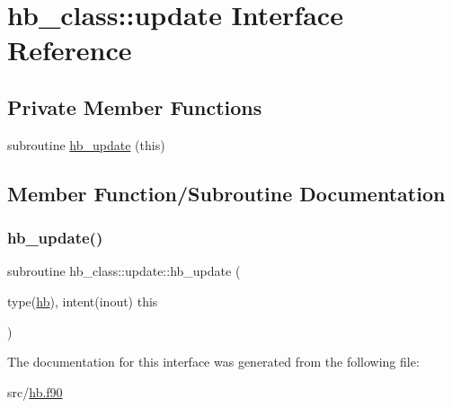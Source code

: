 \hypertarget{interfacehb__class_1_1update}{}\section{hb\+\_\+class\+:\+:update Interface Reference}
\label{interfacehb__class_1_1update}
\subsection*{Private Member Functions}
\begin{DoxyCompactItemize}
\item 
subroutine \hyperlink{interfacehb__class_1_1update_aaeface7e147ec5602333218403fcbbdf}{hb\+\_\+update} (this)
\end{DoxyCompactItemize}


\subsection{Member Function/\+Subroutine Documentation}
\mbox{\label{interfacehb__class_1_1update_aaeface7e147ec5602333218403fcbbdf}} 
\subsubsection{\texorpdfstring{hb\+\_\+update()}{hb\_update()}}
{\footnotesize\ttfamily subroutine hb\+\_\+class\+::update\+::hb\+\_\+update (\begin{DoxyParamCaption}\item[{type(\hyperlink{structhb__class_1_1hb}{hb}), intent(inout)}]{this }\end{DoxyParamCaption})\hspace{0.3cm}{\ttfamily [private]}}



The documentation for this interface was generated from the following file\+:\begin{DoxyCompactItemize}
\item 
src/\hyperlink{hb_8f90}{hb.\+f90}\end{DoxyCompactItemize}

